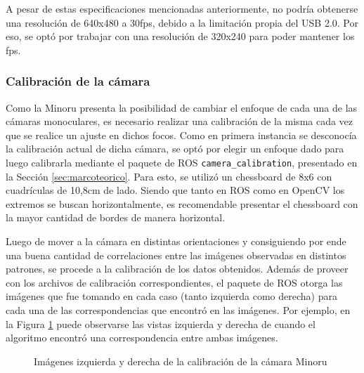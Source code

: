 A pesar de estas especificaciones mencionadas anteriormente, no podría obtenerse una resolución de 640x480 a 30fps, debido a la limitación propia del USB 2.0. Por eso, se optó por trabajar con una resolución de 320x240 para poder mantener los fps.

\subsubsection{Calibración de la cámara}
Como la Minoru presenta la posibilidad de cambiar el enfoque de cada una de las cámaras monoculares, es necesario realizar una calibración de la misma cada vez que se realice un ajuste en dichos focos. Como en primera instancia se desconocía la calibración actual de dicha cámara, se optó por elegir un enfoque dado para luego calibrarla mediante el paquete de ROS \texttt{camera\_calibration}, presentado en la Sección \ref{sec:marcoteorico}. Para esto, se utilizó un chessboard de 8x6 con cuadrículas de 10,8cm de lado. Siendo que tanto en ROS como en OpenCV los extremos se buscan horizontalmente, es recomendable presentar el chessboard con la mayor cantidad de bordes de manera horizontal.

Luego de mover a la cámara en distintas orientaciones y consiguiendo por ende una buena cantidad de correlaciones entre las imágenes observadas en distintos patrones, se procede a la calibración de los datos obtenidos. Además de proveer con los archivos de calibración correspondientes, el paquete de ROS otorga las imágenes que fue tomando en cada caso (tanto izquierda como derecha) para cada una de las correspondencias que encontró en las imágenes. Por ejemplo, en la Figura \ref{fig:minorurightleft} puede observarse las vistas izquierda y derecha de cuando el algoritmo encontró una correspondencia entre ambas imágenes.

\begin{figure}[!ht]
    \centering
    \qquad
    \caption{Imágenes izquierda y derecha de la calibración de la cámara Minoru}
    \label{fig:minorurightleft}
\end{figure}

